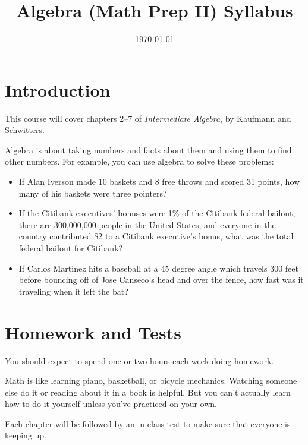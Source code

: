 \documentclass[letterpaper, landscape]{exam}
\title{Algebra (Math Prep II) Syllabus}
\date{\today}
\begin{document}
    \maketitle

    \section{Introduction}
    This course will cover chapters 2--7 of {\em Intermediate Algebra}, by Kaufmann and Schwitters.  

    Algebra is about taking numbers and facts about them and using them to find other numbers.  For
    example, you can use algebra to solve these problems:

    \begin{itemize}
        \item If Alan Iverson made 10 baskets and 8 free throws and scored 31 points, how many of
            his baskets were three pointers?

        \item If the Citibank executives' bonuses were 1\% of the Citibank federal bailout, there
            are 300,000,000 people in the United States, and everyone in the country contributed \$2
            to a Citibank executive's bonus, what was the total federal bailout for Citibank?

        \item If Carlos Martinez hits a baseball at a 45 degree angle which travels 300 feet before
            bouncing off of Jose Canseco's head and over the fence, how fast was it traveling when
            it left the bat?

    \end{itemize}

    \newpage

    \section{Homework and Tests}

    You should expect to spend one or two hours each week doing homework.

    Math is like learning piano, basketball, or bicycle mechanics.  Watching someone else do it or
    reading about it in a book is helpful.  But you can't actually learn how to do it yourself
    unless you've practiced on your own.

    Each chapter will be followed by an in-class test to make sure that everyone is keeping up.
\end{document}
